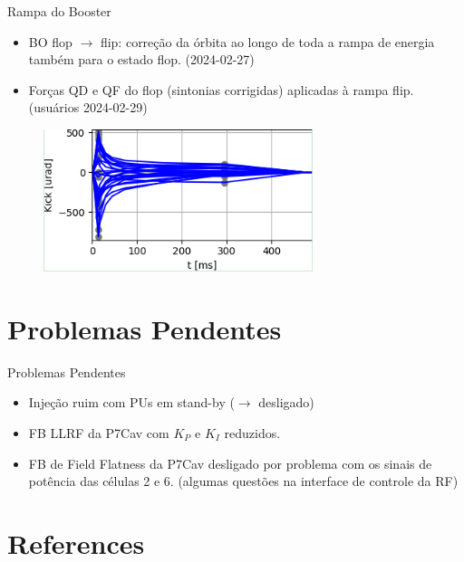 \documentclass{beamer}					  %
\begin{document}
\begin{frame}{Rampa do Booster}
    \vspace{0.4 cm}
    \large{
    \begin{itemize}
            \item BO flop $\rightarrow$ flip: correção da órbita ao longo de toda a rampa de energia também para o estado flop. (2024-02-27) \vspace{0.4cm}
            \item Forças QD e QF do flop (sintonias corrigidas) aplicadas à rampa flip. (usuários 2024-02-29)
    \end{itemize}
    }
    \begin{figure}[H]
            \centering
            \includegraphics[width=0.7\textwidth]{2024-04-19/figures/boramp-kicks.png}
            \label{fig:rampbo-kicks}
    \end{figure}
\end{frame}



\section{Problemas Pendentes}

\begin{frame}{Problemas Pendentes}
    \vspace{0.4 cm}
    \large{
    \begin{itemize}
            \item Injeção ruim com PUs em stand-by ($\rightarrow$ desligado) \vspace{0.5cm}
            \item FB LLRF da P7Cav com $K_P$ e $K_I$ reduzidos. \vspace{0.5cm}
            \item FB de Field Flatness da P7Cav desligado por problema com os sinais de potência das células 2 e 6. (algumas questões na interface de controle da RF)
    \end{itemize}
    }
\end{frame}



\section{References}
\end{document}
